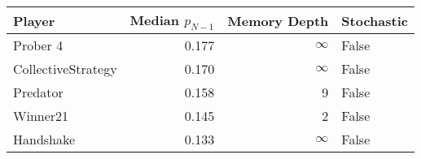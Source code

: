\begin{tabular}{lrrl}
\toprule
             Player &  Median $p_{N-1}$ &  Memory Depth & Stochastic \\
\midrule
           Prober 4 &             0.177 &            \(\infty\) &      False \\
 CollectiveStrategy &             0.170 &            \(\infty\) &      False \\
           Predator &             0.158 &             9 &      False \\
           Winner21 &             0.145 &             2 &      False \\
          Handshake &             0.133 &            \(\infty\) &      False \\
\bottomrule
\end{tabular}
